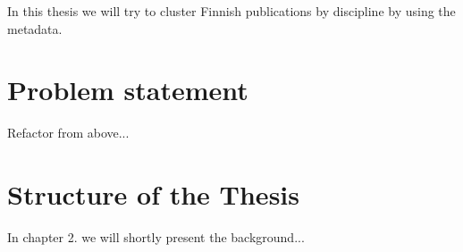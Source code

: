 
In this thesis we will try to cluster Finnish publications by 
discipline by using the metadata.





\section{Problem statement}

Refactor from above...

\section{Structure of the Thesis}
\label{section:structure} 

In chapter 2. we will shortly present the background...
